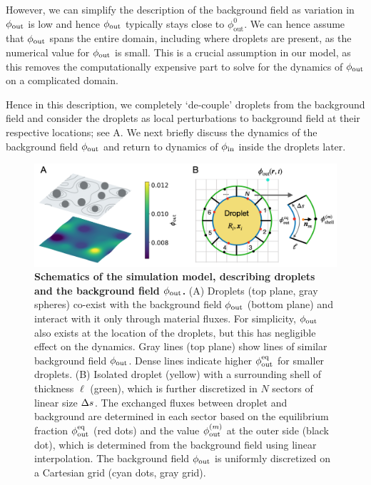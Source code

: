 However, we can simplify the description of the background field as variation in $\phi_\mathrm{out}$ is low and hence $\phi_\mathrm{out}$ typically stays close to $\phi^0_\mathrm{out}$.
We can hence assume that $\phi_\mathrm{out}$ spans the entire domain, including where droplets are present, as the numerical value for $\phi_\mathrm{out}$ is small.
This is a crucial assumption in our model, as this removes the computationally expensive part to solve for the dynamics of $\phi_\mathrm{out}$ on a complicated domain.

Hence in this description, we completely `de-couple' droplets from the background field and consider the droplets as local perturbations to background field at their respective locations; see A.
We next briefly discuss the dynamics of the background field $\phi_\mathrm{out}$ and return to dynamics of $\phi_\mathrm{in}$ inside the droplets later.

\begin{figure}[tb]
\centering
\includegraphics[scale=0.53]{MainContent/Figures/simulation.pdf}
\caption{\textbf{Schematics of the simulation model, describing droplets and the background field $\phi_\mathrm{out}$.}
(A) Droplets (top plane, gray spheres) co-exist with the background field $\phi_\mathrm{out}$ (bottom plane) and interact with it only through material fluxes.
For simplicity, $\phi_\mathrm{out}$ also exists at the location of the droplets, but this has negligible effect on the dynamics.
Gray lines (top plane) show lines of similar background field $\phi_\mathrm{out}$.
Dense lines indicate higher $\phi^\mathrm{eq}_\mathrm{out}$ for smaller droplets.
(B) Isolated droplet (yellow) with a surrounding shell of thickness $\ell$ (green), which is further discretized in $N$ sectors of linear size $\Delta s$.
The exchanged fluxes between droplet and background are determined in each sector based on the equilibrium fraction $\phi^\mathrm{eq}_\mathrm{out}$ (red dots) and the value $\phi_\mathrm{out}^{(m)}$ at the outer side (black dot), which is determined from the background field using linear interpolation.
The background field $\phi_\mathrm{out}$ is uniformly discretized on a Cartesian grid (cyan dots, gray grid).
}
\label{fig:schematics}
\end{figure}



